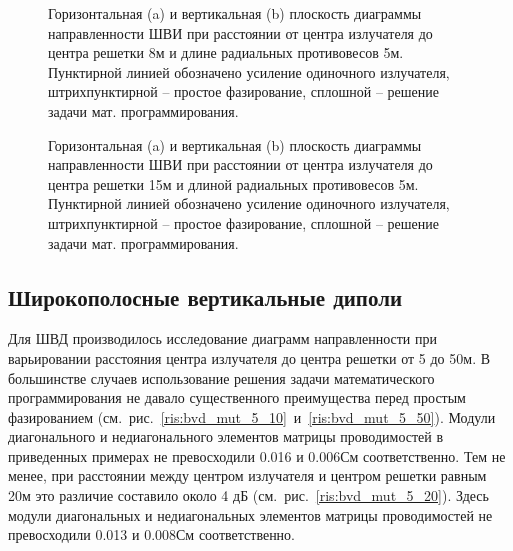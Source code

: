 \begin{figure}
\begin{minipage}[h]{0.49\linewidth}
\end{minipage}
\hfill
\begin{minipage}[h]{0.49\linewidth}
\end{minipage}
\caption{Горизонтальная (a) и вертикальная (b) плоскость диаграммы направленности ШВИ при расстоянии от центра излучателя до центра решетки 8м и длине радиальных противовесов 5м. Пунктирной линией обозначено усиление одиночного излучателя, штрихпунктирной -- простое фазирование, сплошной -- решение задачи мат. программирования.}
\label{ris:bve_mut_5_8}
\end{figure}

\begin{figure}
\begin{minipage}[h]{0.49\linewidth}
\end{minipage}
\hfill
\begin{minipage}[h]{0.49\linewidth}
\end{minipage}
\caption{Горизонтальная (a) и вертикальная (b) плоскость диаграммы направленности ШВИ при расстоянии от центра излучателя до центра решетки 15м и длиной радиальных противовесов 5м. Пунктирной линией обозначено усиление одиночного излучателя, штрихпунктирной -- простое фазирование, сплошной -- решение задачи мат. программирования.}
\label{ris:bve_mut_5_15}
\end{figure}

\subsection{Широкополосные вертикальные диполи}

Для ШВД производилось исследование диаграмм направленности при варьировании расстояния центра излучателя до центра решетки от 5 до 50м. В большинстве случаев использование решения задачи математического программирования не давало существенного преимущества перед простым фазированием (см.~рис.~\ref{ris:bvd_mut_5_10}~и~\ref{ris:bvd_mut_5_50}). Модули диагонального и недиагонального элементов матрицы проводимостей в приведенных примерах не превосходили 0.016 и 0.006См соответственно.  Тем не менее, при расстоянии между центром излучателя и центром решетки равным 20м это различие составило около 4 дБ (см.~рис.~\ref{ris:bvd_mut_5_20}). Здесь модули диагональных и недиагональных элементов матрицы проводимостей не превосходили 0.013 и 0.008См соответственно.

